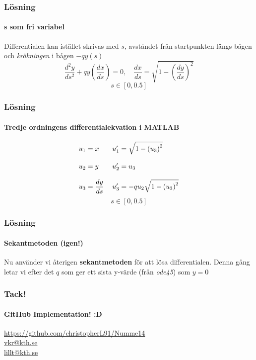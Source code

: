 \documentclass[xcolor=dvipsnames]{beamer}
\begin{document}
\begin{frame}
\frametitle{Lösning}
\framesubtitle{s som fri variabel}
Differentialen kan istället skrivas med $s$, avståndet från startpunkten längs bågen och \textit{krökningen} i bågen $-qy(s)$
\begin{equation}
	\dfrac{d^2y}{ds^2}+qy\left(\dfrac{dx}{ds}\right)=0, \quad \dfrac{dx}{ds} = \sqrt{1-\left(\dfrac{dy}{ds}\right)^2} \nonumber
\end{equation}
\begin{equation}
s \in [0, 0.5] \nonumber
\end{equation}

\end{frame}

\begin{frame}
\frametitle{Lösning}
\framesubtitle{Tredje ordningens differentialekvation i MATLAB}
\begin{align}
\begin{tabular}{ l l }
	$u_1 = x$ 					& $u_1' = \sqrt{1-\left(u_3\right)^2}$\\
	& \\
	$u_2 = y$ 					& $u_2' = u_3$\\
	& \\
	$u_3 = \dfrac{dy}{ds}$ 		& $u_3' = -qu_2\sqrt{1-\left(u_3\right)^2}$
\end{tabular}
\nonumber
\end{align}
\begin{equation}
s \in [0, 0.5] \nonumber
\end{equation}
\end{frame}

\begin{frame}
\frametitle{Lösning}
\framesubtitle{Sekantmetoden (igen!)}
Nu använder vi återigen \textbf{sekantmetoden} för att lösa differentialen. Denna gång letar vi efter det $q$ som ger ett sista y-värde (från \textit{ode45}) som $y=0$
\end{frame}

\begin{frame}
\frametitle{Tack!}
\framesubtitle{GitHub Implementation! :D}
\centering
\url{https://github.com/christopherL91/Numme14}\\
\href{mailto:vkr@kth.se}{vkr@kth.se}\\
\href{mailto:lillt@kth.se}{lillt@kth.se}
\end{frame}
\end{document}
